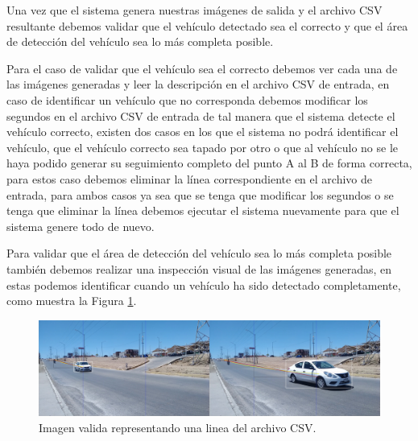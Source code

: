
Una vez que el sistema genera nuestras imágenes de salida y el archivo CSV resultante debemos validar que el vehículo detectado sea el correcto y que el área de detección del vehículo sea lo más completa posible.

Para el caso de validar que el vehículo sea el correcto debemos ver cada una de las imágenes generadas y leer la descripción en el archivo CSV de entrada, en caso de identificar un vehículo que no corresponda debemos modificar los segundos en el archivo CSV de entrada de tal manera que el sistema detecte el vehículo  correcto, existen dos casos en los que el sistema no podrá identificar el vehículo, que el vehículo correcto sea tapado por otro o que al vehículo no se le haya podido generar su seguimiento completo del punto A al B de forma correcta, para estos caso debemos eliminar la línea correspondiente en el archivo de entrada, para ambos casos ya sea que se tenga que modificar los segundos o se tenga que eliminar la línea debemos ejecutar el sistema nuevamente para que el sistema genere todo de nuevo.

Para validar que el área de detección del vehículo sea lo más completa posible también debemos realizar una inspección visual de las imágenes generadas, en estas podemos identificar cuando un vehículo ha sido detectado completamente, como muestra la Figura \ref{fig:ImagenValida}.

\begin{figure}[H]
    \centering
    \includegraphics[width=1\textwidth]{Metodologia/imgs/Valido.jpg}
    \caption{Imagen valida representando una linea del archivo CSV.}
    \label{fig:ImagenValida}
\end{figure}

